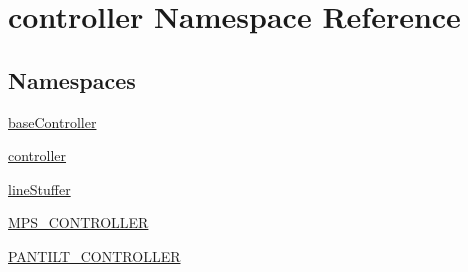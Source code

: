 \hypertarget{namespacecontroller}{}\section{controller Namespace Reference}
\label{namespacecontroller}
\subsection*{Namespaces}
\begin{DoxyCompactItemize}
\item 
 \hyperlink{namespacecontroller_1_1baseController}{base\+Controller}
\item 
 \hyperlink{namespacecontroller_1_1controller}{controller}
\item 
 \hyperlink{namespacecontroller_1_1lineStuffer}{line\+Stuffer}
\item 
 \hyperlink{namespacecontroller_1_1MPS__CONTROLLER}{M\+P\+S\+\_\+\+C\+O\+N\+T\+R\+O\+L\+L\+E\+R}
\item 
 \hyperlink{namespacecontroller_1_1PANTILT__CONTROLLER}{P\+A\+N\+T\+I\+L\+T\+\_\+\+C\+O\+N\+T\+R\+O\+L\+L\+E\+R}
\end{DoxyCompactItemize}
